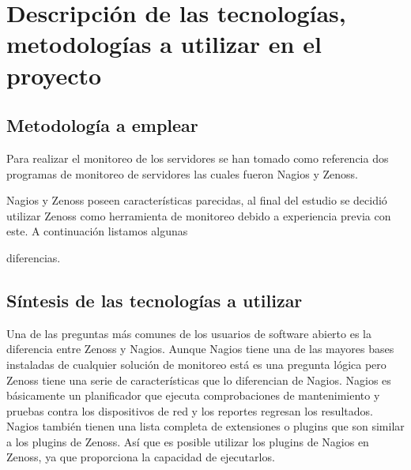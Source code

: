 \section{Descripción de las tecnologías, metodologías a utilizar
en el proyecto}

\subsection{Metodología a emplear}

Para realizar el monitoreo de los servidores se han tomado como
referencia dos programas de monitoreo de servidores las cuales fueron Nagios y Zenoss.

Nagios y Zenoss poseen características parecidas, al final del
estudio se decidió utilizar Zenoss como herramienta de monitoreo debido a experiencia
previa con este. A continuación listamos algunas

diferencias.

\subsection{Síntesis de las tecnologías a utilizar}

Una de las preguntas más comunes de los usuarios de software abierto
es la diferencia entre Zenoss y Nagios. Aunque Nagios tiene una de las
mayores bases instaladas de cualquier solución de monitoreo está
es una pregunta lógica pero Zenoss tiene una serie de características
que lo diferencian de Nagios. Nagios es básicamente un planificador
que ejecuta comprobaciones de mantenimiento y pruebas contra los
dispositivos de red y los reportes regresan los resultados. Nagios
también tienen una lista completa de extensiones o plugins que son
similar a los plugins de Zenoss. Así que es posible utilizar los
plugins de Nagios en Zenoss, ya que proporciona la capacidad de
ejecutarlos.

